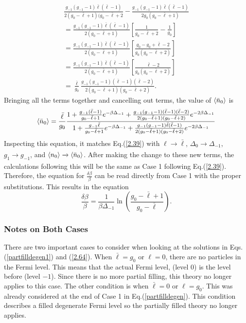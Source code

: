 \begin{gather}
    \frac{g_{-1}(g_{-1}-1)\bar{\ell}(\bar{\ell}-1)}{2(g_0-\bar{\ell}+1)(g_0-\bar{\ell}+2}-\frac{g_{-1}(g_{-1}-1)\bar{\ell}(\bar{\ell}-1)}{2g_0(g_0-\bar{\ell}+1)}\nonumber\\
    =\frac{g_{-1}(g_{-1}-1)\bar{\ell}(\bar{\ell}-1)}{2(g_0-\bar{\ell}+1)}[\frac{1}{g_0-\bar{\ell}+2}-\frac{1}{g_0}]\nonumber\\
    =\frac{g_{-1}(g_{-1}-1)\bar{\ell}(\bar{\ell}-1)}{2(g_0-\bar{\ell}+1)}[\frac{g_0-g_0+\bar{\ell}-2}{g_0(g_0-\bar{\ell}+2)}]\nonumber\\
    =\frac{g_{-1}(g_{-1}-1)\bar{\ell}(\bar{\ell}-1)}{2(g_0-\bar{\ell}+1)}[\frac{\bar{\ell}-2}{g_0(g_0-\bar{\ell}+2)}]\nonumber\\
    =\frac{\bar{\ell}}{g_0}\frac{g_{-1}(g_{-1}-1)(\bar{\ell}-1)(\bar{\ell}-2)}{2(g_0-\bar{\ell}+1)(g_0-\bar{\ell}+2)}.
\end{gather}
Bringing all the terms together and cancelling out terms, the value of $\left<{\bar{n}_0}\right>$ is 
\begin{equation}
    \left<{\bar{n}_0}\right>=\frac{\bar{\ell}}{g_0}\frac{1+\frac{g_{-1}(\bar{\ell}-1)}{g_0-\bar{\ell}+1}e^{-\beta\Delta_{-1}}+\frac{g_{-1}(g_{-1}-1)(\bar{\ell}-1)(\bar{\ell}-2)}{2(g_0-\bar{\ell}+1)(g_0-\bar{\ell}+2)}e^{-2\beta\Delta_{-1}}}{1+\frac{g_{-1}\bar{\ell}}{g_0-\bar{\ell}+1}e^{-\beta\Delta_{-1}}+\frac{g_{-1}(g_{-1}-1)\bar{\ell}(\bar{\ell}-1)}{2(g_0-\bar{\ell}+1)(g_0-\bar{\ell}+2)}e^{-2\beta\Delta_{-1}}}
\end{equation}
Inspecting this equation, it matches Eq.\@ (\ref{2.39}) with $\ell\xrightarrow[]{}\bar{\ell}$, $\Delta_0\xrightarrow[]{}\Delta_{-1}$, $g_1\xrightarrow[]{}g_{-1}$, and $\left<{n_0}\right>\xrightarrow[]{}\left<{\bar{n}_0}\right>$. After making the change to these new terms, the calculations following this will be the same as Case 1 following Eq.\@ (\ref{2.39}). Therefore, the equation for $\frac{\delta\beta}{\beta}$ can be read directly from Case 1 with the proper substitutions. This results in the equation 
\begin{equation}
    \frac{\delta\beta}{\beta}=\frac{1}{\beta\Delta_{-1}}\ln(\frac{g_0-\bar{\ell}+1}{g_0-\bar{\ell}}). \label{2.64}
\end{equation}
\subsubsection{Notes on Both Cases}
There are two important cases to consider when looking at the solutions in Eqs.\@ (\ref{partfilldegen1}) and (\ref{2.64}). When $\bar{\ell}=g_0$ or $\ell=0$, there are no particles in the Fermi level. This means that the actual Fermi level, (level $0$) is the level before (level $-1$). Since there is no more partial filling, this theory no longer applies to this case. The other condition is when $\bar{\ell}=0$ or $\ell=g_0$. This was already considered at the end of Case 1 in Eq.\@ (\ref{partfilldegen}). This condition describes a filled degenerate Fermi level so the partially filled theory no longer applies. 